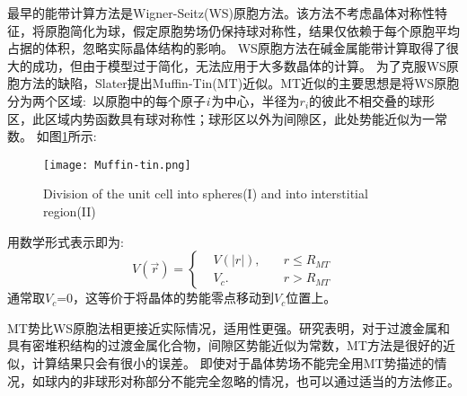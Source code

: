 最早的能带计算方法是Wigner-Seitz(WS)原胞方法\cite{PR43-804_1933}。该方法不考虑晶体对称性特征，将原胞简化为球，假定原胞势场仍保持球对称性，结果仅依赖于每个原胞平均占据的体积，忽略实际晶体结构的影响。%
\textrm{WS}原胞方法在碱金属能带计算取得了很大的成功，但由于模型过于简化，无法应用于大多数晶体的计算。%
为了克服WS原胞方法的缺陷，Slater提出Muffin-Tin(MT)近似\cite{PR51-846_1937}。MT近似的主要思想是将WS原胞分为两个区域:~以原胞中的每个原子{\it i}\,为中心，半径为$r_i$的彼此不相交叠的球形区，此区域内势函数具有球对称性；球形区以外为间隙区，此处势能近似为一常数。
如图\ref{Muffin_tin-1}所示:
\begin{figure}[h!]
\centering
\texttt{[image: Muffin-tin.png]}
\caption{\small \textrm{Division of the unit cell into spheres(I) and into interstitial region(II)}}%
\label{Muffin_tin-1}
\end{figure} 

用数学形式表示即为:
\begin{equation}
  V(\vec r)=\left\{
  \begin{aligned}
    &V(|r|),\quad&r\leqslant R_{MT} \\
    &V_c.&r>R_{MT}
  \end{aligned}\right.
  \label{eq:Muffin-Tin}
\end{equation}
通常取$V_c$=0，这等价于将晶体的势能零点移动到$V_c$位置上。

MT势比WS原胞法相更接近实际情况，适用性更强。研究表明，对于过渡金属和具有密堆积结构的过渡金属化合物，间隙区势能近似为常数，MT方法是很好的近似，计算结果只会有很小的误差\cite{PR153-931_1967,PRB1-1318_1970,PLA33-414_1970}。%
即使对于晶体势场不能完全用MT势描述的情况，如球内的非球形对称部分不能完全忽略的情况，也可以通过适当的方法修正。

